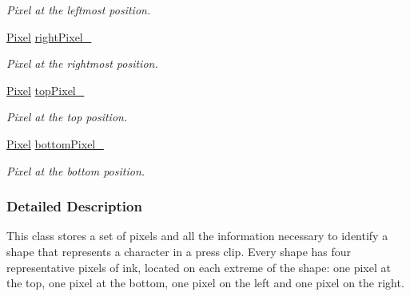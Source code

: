 \begin{CompactItemize}
\begin{CompactList}\small\item\em Pixel at the leftmost position. \item\end{CompactList}\item 
\hypertarget{class_shape_16adfccce492a7a0e34c5ade941c32fd}{
\hyperlink{_shape_8hpp_535e59456e3e633842529cfa8ea103c4}{Pixel} \hyperlink{class_shape_16adfccce492a7a0e34c5ade941c32fd}{rightPixel\_\-}}
\label{class_shape_16adfccce492a7a0e34c5ade941c32fd}

\begin{CompactList}\small\item\em Pixel at the rightmost position. \item\end{CompactList}\item 
\hypertarget{class_shape_c6755e0dbd9d2eaf537e232fd003c918}{
\hyperlink{_shape_8hpp_535e59456e3e633842529cfa8ea103c4}{Pixel} \hyperlink{class_shape_c6755e0dbd9d2eaf537e232fd003c918}{topPixel\_\-}}
\label{class_shape_c6755e0dbd9d2eaf537e232fd003c918}

\begin{CompactList}\small\item\em Pixel at the top position. \item\end{CompactList}\item 
\hypertarget{class_shape_8277820de6ff8da989a0659f4e5d82d1}{
\hyperlink{_shape_8hpp_535e59456e3e633842529cfa8ea103c4}{Pixel} \hyperlink{class_shape_8277820de6ff8da989a0659f4e5d82d1}{bottomPixel\_\-}}
\label{class_shape_8277820de6ff8da989a0659f4e5d82d1}

\begin{CompactList}\small\item\em Pixel at the bottom position. \item\end{CompactList}\end{CompactItemize}


\subsubsection{Detailed Description}
This class stores a set of pixels and all the information necessary to identify a shape that represents a character in a press clip. Every shape has four representative pixels of ink, located on each extreme of the shape: one pixel at the top, one pixel at the bottom, one pixel on the left and one pixel on the right.

